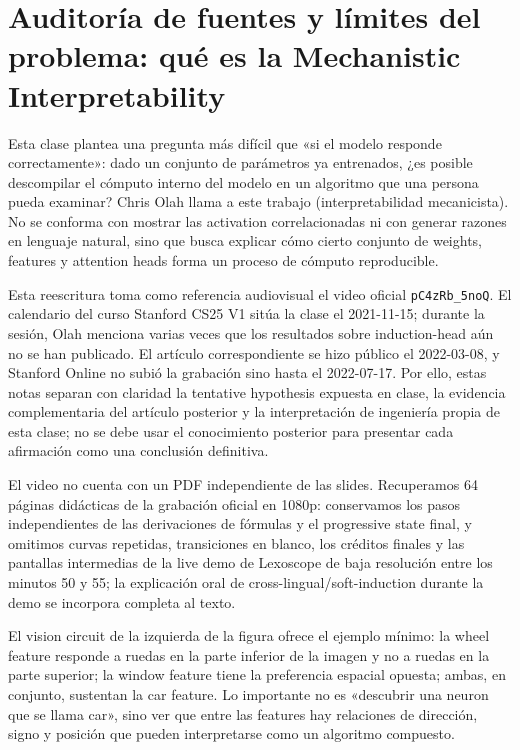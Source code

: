 \section{Auditoría de fuentes y límites del problema: qué es la Mechanistic Interpretability}

Esta clase plantea una pregunta más difícil que «si el modelo responde correctamente»: dado un conjunto de parámetros ya entrenados, ¿es posible descompilar el cómputo interno del modelo en un algoritmo que una persona pueda examinar? Chris Olah llama a este trabajo  (interpretabilidad mecanicista). No se conforma con mostrar las activation correlacionadas ni con generar razones en lenguaje natural, sino que busca explicar cómo cierto conjunto de weights, features y attention heads forma un proceso de cómputo reproducible.

Esta reescritura toma como referencia audiovisual el video oficial \texttt{pC4zRb\_5noQ}. El calendario del curso Stanford CS25 V1 sitúa la clase el 2021-11-15; durante la sesión, Olah menciona varias veces que los resultados sobre induction-head aún no se han publicado. El artículo correspondiente se hizo público el 2022-03-08, y Stanford Online no subió la grabación sino hasta el 2022-07-17. Por ello, estas notas separan con claridad la tentative hypothesis expuesta en clase, la evidencia complementaria del artículo posterior y la interpretación de ingeniería propia de esta clase; no se debe usar el conocimiento posterior para presentar cada afirmación como una conclusión definitiva.

El video no cuenta con un PDF independiente de las slides. Recuperamos 64 páginas didácticas de la grabación oficial en 1080p: conservamos los pasos independientes de las derivaciones de fórmulas y el progressive state final, y omitimos curvas repetidas, transiciones en blanco, los créditos finales y las pantallas intermedias de la live demo de Lexoscope de baja resolución entre los minutos 50 y 55; la explicación oral de cross-lingual/soft-induction durante la demo se incorpora completa al texto.


El vision circuit de la izquierda de la figura ofrece el ejemplo mínimo: la wheel feature responde a ruedas en la parte inferior de la imagen y no a ruedas en la parte superior; la window feature tiene la preferencia espacial opuesta; ambas, en conjunto, sustentan la car feature. Lo importante no es «descubrir una neuron que se llama car», sino ver que entre las features hay relaciones de dirección, signo y posición que pueden interpretarse como un algoritmo compuesto.

